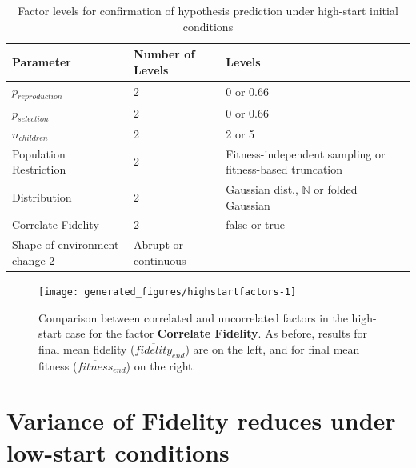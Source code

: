 


\begin{table} %
	\begin{center}
		\caption{Factor levels for confirmation of hypothesis prediction under high-start initial conditions}
		\begin{tabular}{@{}llp{6cm}@{}}
			\toprule
			Parameter              & Number of Levels & Levels                                                   \\
			\midrule
			$p_{reproduction}$     & 2                & 0 or 0.66                                                \\
			$p_{selection}$        & 2                & 0 or 0.66                                                \\
			$n_{children}$         & 2                & 2 or 5                                                   \\
			Population Restriction & 2                & Fitness-independent sampling or fitness-based truncation \\
			Distribution           & 2                & Gaussian dist., $\mathbb{N}$ or folded Gaussian          \\
			Correlate Fidelity     & 2                & false or true                                            \\
			Shape of environment change		2&	Abrupt or continuous\\
			\bottomrule
		\end{tabular}
	\end{center}
\end{table}

\begin{knitrout}
\color{fgcolor}\begin{figure}[htp]
\texttt{[image: generated\_figures/highstartfactors-1]} \caption{Comparison between correlated and uncorrelated factors in the high-start case for the factor \textbf{Correlate Fidelity}. As before, results for final mean fidelity ($\overline{fidelity}_{end}$) are on the left, and for final mean fitness ($\overline{fitness}_{end}$) on the right.}\label{fig:highstartfactors}
\end{figure}


\end{knitrout}

\section{Variance of Fidelity reduces under low-start conditions}\label{sd-low-start}

